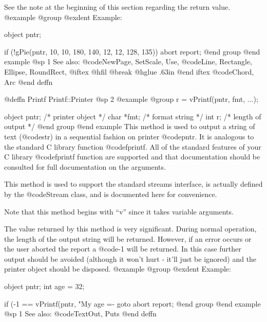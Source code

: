 See the note at the beginning of this section regarding the return value.
@example
@group
@exdent Example:

object  pntr;

if (!gPie(pntr, 10, 10, 180, 140, 12, 12, 128, 135))
        abort report;
@end group
@end example
@sp 1
See also:  @code{NewPage, SetScale, Use,}
        @code{Line, Rectangle, Ellipse, RoundRect,}
@iftex
@hfil @break @hglue .63in 
@end iftex
@code{Chord, Arc}
@end deffn
















@deffn {Printf} Printf::Printer
@sp 2
@example
@group
r = vPrintf(pntr, fmt, ...);

object   pntr;  /*  printer object     */
char    *fmt;   /*  format string      */
int      r;     /*  length of output   */
@end group
@end example
This method is used to output a string of text (@code{str}) in a sequential
fashion on printer @code{pntr}.  It is analogous to the standard C library
function @code{fprintf}.  All of the standard features of your C library
@code{fprintf} function are supported and that documentation should be
consulted for full documentation on the arguments.

This method is used to support the standard streams interface, is
actually defined by the @code{Stream} class, and is documented here for
convenience.

Note that this method begins with ``v'' since it takes variable arguments.

The value returned by this method is very significant.  During normal
operation, the length of the output string will be returned.  However,
if an error occurs or the user aborted the report a @code{-1} will be
returned.  In this case further output should be avoided (although it
won't hurt - it'll just be ignored) and the printer object should be
disposed.
@example
@group
@exdent Example:

object  pntr;
int     age = 32;

if (-1 == vPrintf(pntr, "My age =- %
        goto abort report;
@end group
@end example
@sp 1
See also:  @code{TextOut, Puts}
@end deffn















